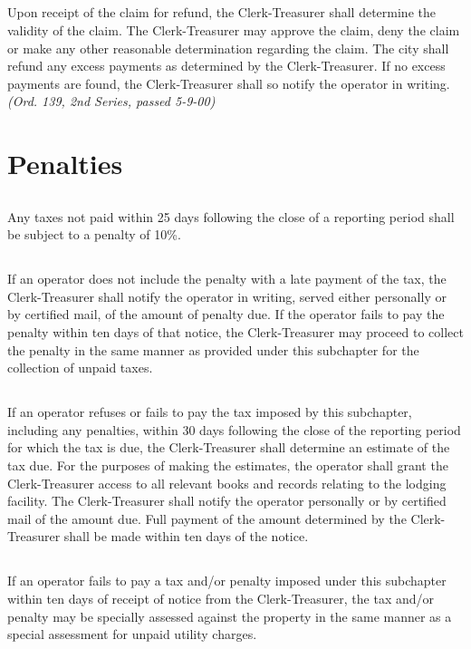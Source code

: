 \subsection{}
Upon receipt of the claim for refund, the Clerk-Treasurer shall determine the validity of the claim. The Clerk-Treasurer may approve the claim, deny the claim or make any other reasonable determination regarding the claim. The city shall refund any excess payments as determined by the Clerk-Treasurer. If no excess payments are found, the Clerk-Treasurer shall so notify the operator in writing.\\
\emph{(Ord. 139, 2nd Series, passed 5-9-00)}

\section{Penalties}
\subsection{}
Any taxes not paid within 25 days following the close of a reporting period shall be subject to a penalty of 10\%.
\subsection{}
If an operator does not include the penalty with a late payment of the tax, the Clerk-Treasurer shall notify the operator in writing, served either personally or by certified mail, of the amount of penalty due. If the operator fails to pay the penalty within ten days of that notice, the Clerk-Treasurer may proceed to collect the penalty in the same manner as provided under this subchapter for the collection of unpaid taxes.
\subsection{}
If an operator refuses or fails to pay the tax imposed by this subchapter, including any penalties, within 30 days following the close of the reporting period for which the tax is due, the Clerk-Treasurer shall determine an estimate of the tax due. For the purposes of making the estimates, the operator shall grant the Clerk-Treasurer access to all relevant books and records relating to the lodging facility. The Clerk-Treasurer shall notify the operator personally or by certified mail of the amount due. Full payment of the amount determined by the Clerk-Treasurer shall be made within ten days of the notice.
\subsection{}
If an operator fails to pay a tax and/or penalty imposed under this subchapter within ten days of receipt of notice from the Clerk-Treasurer, the tax and/or penalty may be specially assessed against the property in the same manner as a special assessment for unpaid utility charges.
